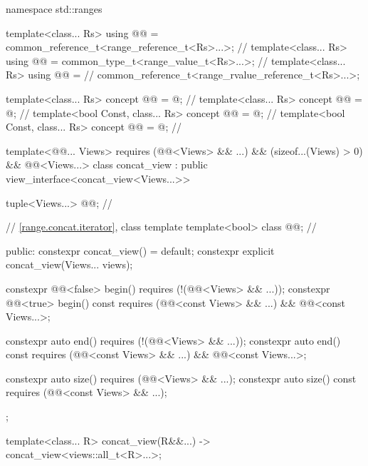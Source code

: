 %
\begin{codeblock}
namespace std::ranges {
  template<class... Rs>
  using @@ = common_reference_t<range_reference_t<Rs>...>;      // \expos
  template<class... Rs>
  using @@ = common_type_t<range_value_t<Rs>...>;                   // \expos
  template<class... Rs>
  using @@ =                                             // \expos
    common_reference_t<range_rvalue_reference_t<Rs>...>;

  template<class... Rs>
    concept @@ = @\seebelow@;     // \expos
  template<class... Rs>
    concept @@ = @\seebelow@;                     // \expos
  template<bool Const, class... Rs>
    concept @@ = @\seebelow@;        // \expos
  template<bool Const, class... Rs>
    concept @@ = @\seebelow@;        // \expos

  template<@@... Views>
    requires (@@<Views> && ...) && (sizeof...(Views) > 0) &&
              @@<Views...>
  class concat_view : public view_interface<concat_view<Views...>> {

    tuple<Views...> @@;                                             // \expos

    // \ref{range.concat.iterator}, class template 
    template<bool> class @@;                                      // \expos

  public:
    constexpr concat_view() = default;
    constexpr explicit concat_view(Views... views);

    constexpr @@<false> begin() requires (!(@@<Views> && ...));
    constexpr @@<true> begin() const
      requires (@@<const Views> && ...) && @@<const Views...>;

    constexpr auto end() requires (!(@@<Views> && ...));
    constexpr auto end() const
      requires (@@<const Views> && ...) && @@<const Views...>;

    constexpr auto size() requires (@@<Views> && ...);
    constexpr auto size() const requires (@@<const Views> && ...);
  };

  template<class... R>
    concat_view(R&&...) -> concat_view<views::all_t<R>...>;
}
\end{codeblock}

